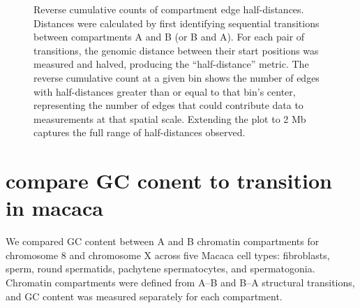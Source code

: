 \documentclass[
  a4paper,
]{scrbook}
\begin{document}
\begin{figure}


\caption{\label{fig-edge}Reverse cumulative counts of compartment edge
half-distances. Distances were calculated by first identifying
sequential transitions between compartments A and B (or B and A). For
each pair of transitions, the genomic distance between their start
positions was measured and halved, producing the ``half-distance''
metric. The reverse cumulative count at a given bin shows the number of
edges with half-distances greater than or equal to that bin's center,
representing the number of edges that could contribute data to
measurements at that spatial scale. Extending the plot to 2 Mb captures
the full range of half-distances observed.}

\end{figure}%

\chapter{compare GC conent to transition in
macaca}\label{compare-gc-conent-to-transition-in-macaca}

We compared GC content between A and B chromatin compartments for
chromosome 8 and chromosome X across five Macaca cell types:
fibroblasts, sperm, round spermatids, pachytene spermatocytes, and
spermatogonia. Chromatin compartments were defined from A--B and B--A
structural transitions, and GC content was measured separately for each
compartment.
\end{document}

